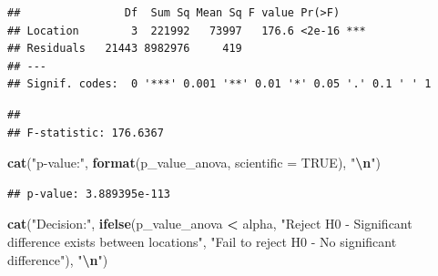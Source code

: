 \documentclass[
  12pt,
]{article}
\newenvironment{Shaded}{\begin{snugshade}}{\end{snugshade}}
\newcommand{\AttributeTok}[1]{\textcolor[rgb]{0.13,0.29,0.53}{#1}}
\newcommand{\CommentTok}[1]{\textcolor[rgb]{0.56,0.35,0.01}{\textit{#1}}}
\newcommand{\ConstantTok}[1]{\textcolor[rgb]{0.56,0.35,0.01}{#1}}
\newcommand{\DecValTok}[1]{\textcolor[rgb]{0.00,0.00,0.81}{#1}}
\newcommand{\FunctionTok}[1]{\textcolor[rgb]{0.13,0.29,0.53}{\textbf{#1}}}
\newcommand{\NormalTok}[1]{#1}
\newcommand{\OtherTok}[1]{\textcolor[rgb]{0.56,0.35,0.01}{#1}}
\newcommand{\SpecialCharTok}[1]{\textcolor[rgb]{0.81,0.36,0.00}{\textbf{#1}}}
\newcommand{\StringTok}[1]{\textcolor[rgb]{0.31,0.60,0.02}{#1}}
\begin{document}
\begin{verbatim}
##                Df  Sum Sq Mean Sq F value Pr(>F)    
## Location        3  221992   73997   176.6 <2e-16 ***
## Residuals   21443 8982976     419                   
## ---
## Signif. codes:  0 '***' 0.001 '**' 0.01 '*' 0.05 '.' 0.1 ' ' 1
\end{verbatim}

\begin{Shaded}
\end{Shaded}

\begin{verbatim}
## 
## F-statistic: 176.6367
\end{verbatim}

\begin{Shaded}
\begin{Highlighting}[]
\FunctionTok{cat}\NormalTok{(}\StringTok{"p{-}value:"}\NormalTok{, }\FunctionTok{format}\NormalTok{(p\_value\_anova, }\AttributeTok{scientific =} \ConstantTok{TRUE}\NormalTok{), }\StringTok{"}\SpecialCharTok{\textbackslash{}n}\StringTok{"}\NormalTok{)}
\end{Highlighting}
\end{Shaded}

\begin{verbatim}
## p-value: 3.889395e-113
\end{verbatim}

\begin{Shaded}
\begin{Highlighting}[]
\FunctionTok{cat}\NormalTok{(}\StringTok{"Decision:"}\NormalTok{, }\FunctionTok{ifelse}\NormalTok{(p\_value\_anova }\SpecialCharTok{\textless{}}\NormalTok{ alpha, }\StringTok{"Reject H0 {-} Significant difference exists between locations"}\NormalTok{,}
    \StringTok{"Fail to reject H0 {-} No significant difference"}\NormalTok{), }\StringTok{"}\SpecialCharTok{\textbackslash{}n}\StringTok{"}\NormalTok{)}
\end{Highlighting}
\end{Shaded}
\end{document}

